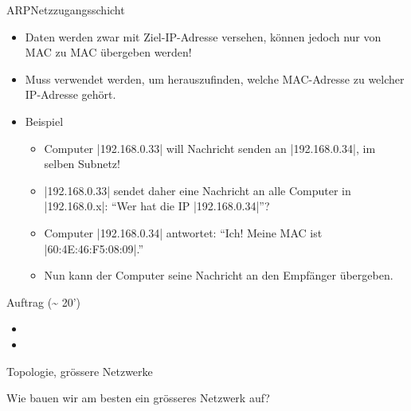 \begin{frame}[fragile]{\acrfull{ARP}}{Netzzugangsschicht}
    \begin{itemize}[<+->]
        \item Daten werden zwar mit Ziel-\gls{IP}-Adresse versehen, können jedoch nur von \gls{MAC} zu \gls{MAC} übergeben werden!
        \item Muss verwendet werden, um herauszufinden, welche \gls{MAC}-Adresse zu welcher \gls{IP}-Adresse gehört.
        \item Beispiel
              \begin{itemize}[<+->]
                  \item Computer \commandbox|192.168.0.33| will Nachricht senden an \commandbox|192.168.0.34|, im selben Subnetz!
                  \item \commandbox|192.168.0.33| sendet daher eine Nachricht an alle Computer in \commandbox|192.168.0.x|: \enquote{Wer hat die \gls{IP} \commandbox|192.168.0.34|}?
                  \item Computer \commandbox|192.168.0.34| antwortet: \enquote{Ich! Meine \gls{MAC} ist \commandbox|60:4E:46:F5:08:09|.}
                  \item Nun kann der Computer seine Nachricht an den Empfänger übergeben.
              \end{itemize}
    \end{itemize}
\end{frame}

\begin{frame}{Auftrag (\textasciitilde{} 20')}
    \begin{itemize}
        \item {}
        \item {}
    \end{itemize}
\end{frame}

\begin{frame}[shrink=8]{Topologie, grössere Netzwerke}
    \begin{center}
        Wie bauen wir am besten ein grösseres Netzwerk auf?
    \end{center}

    

\end{frame}

